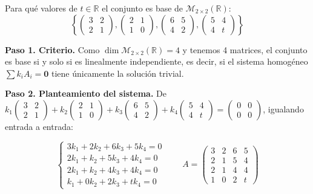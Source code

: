 \begin{prob} Para qué valores de $t\in\mathbb{R}$ el conjunto es base de $\mathcal{M}_{2\times2}(\mathbb{R})$:
$$\left\{\begin{pmatrix}3&2\\2&1\end{pmatrix}, \begin{pmatrix}2&1\\1&0\end{pmatrix}, \begin{pmatrix}6&5\\4&2\end{pmatrix}, \begin{pmatrix}5&4\\4&t\end{pmatrix}\right\}$$

\begin{myproof}
\textbf{Paso 1. Criterio.} Como $\dim \mathcal{M}_{2\times2}(\mathbb{R})=4$ y tenemos 4 matrices, el conjunto es base si y solo si es linealmente independiente, es decir, si el sistema homogéneo $\sum k_i A_i = \mathbf{0}$ tiene únicamente la solución trivial.

\textbf{Paso 2. Planteamiento del sistema.} De $k_1\begin{pmatrix}3&2\\2&1\end{pmatrix} + k_2\begin{pmatrix}2&1\\1&0\end{pmatrix} + k_3\begin{pmatrix}6&5\\4&2\end{pmatrix} + k_4\begin{pmatrix}5&4\\4&t\end{pmatrix} = \begin{pmatrix}0&0\\0&0\end{pmatrix}$, igualando entrada a entrada:

$$\begin{cases}
3k_1 + 2k_2 + 6k_3 + 5k_4 = 0 \\
2k_1 + k_2 + 5k_3 + 4k_4 = 0 \\
2k_1 + k_2 + 4k_3 + 4k_4 = 0 \\
k_1 + 0k_2 + 2k_3 + t k_4 = 0
\end{cases}
\qquad
A = \begin{pmatrix}
3 & 2 & 6 & 5 \\
2 & 1 & 5 & 4 \\
2 & 1 & 4 & 4 \\
1 & 0 & 2 & t
\end{pmatrix}$$


\end{myproof}
\end{prob}
